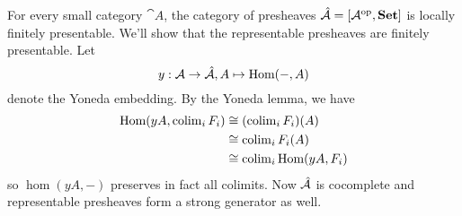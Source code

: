 \begin{Example}
For every small category $\cat A$, the category of presheaves $\hat{\mathcal{A}} = [\mathcal{A}^{\textrm{op}},\mathbf{Set}]$ is locally finitely presentable. We'll show that the representable presheaves are finitely presentable. Let \[ y : \mathcal{A} \to \hat{\mathcal{A}}, A \mapsto \textrm{Hom}(-,A) \] denote the Yoneda embedding. By the Yoneda lemma, we have
\begin{align*}
\textrm{Hom}(yA, \operatorname{colim}_i F_i) &\cong (\operatorname{colim}_i F_i)(A) \\
&\cong \operatorname{colim}_i F_i(A) \\
&\cong \operatorname{colim}_i \textrm{Hom}(yA, F_i)
\end{align*}
so $\hom(yA,-)$ preserves in fact all colimits. Now $\hat{\mathcal{A}}$ is cocomplete and representable presheaves form a strong generator as well. %
\end{Example}

